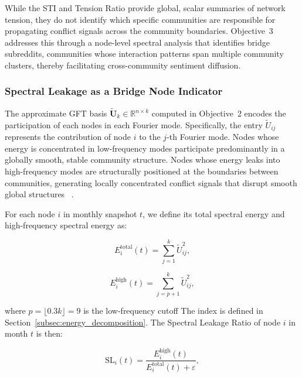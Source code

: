 \documentclass[a4paper,fleqn]{cas-dc}
\begin{document}
While the STI and Tension Ratio provide global, scalar summaries of
network tension, they do not identify which specific communities are
responsible for propagating conflict signals across the community
boundaries. Objective~3 addresses this through a node-level spectral
analysis that identifies bridge subreddits, communities
whose interaction patterns span multiple community clusters,
thereby facilitating cross-community sentiment diffusion.

\subsubsection{Spectral Leakage as a Bridge Node Indicator}
\label{subsec:spectral_leakage}

The approximate GFT basis $\tilde{\mathbf{U}}_k \in \mathbb{R}^{n
\times k}$ computed in Objective~2 encodes the participation of each
nodes in each Fourier mode. Specifically, the entry $\tilde{U}_{ij}$
represents the contribution of node $i$ to the $j$-th Fourier mode.
Nodes whose energy is concentrated in low-frequency modes participate
predominantly in a globally smooth, stable community structure. Nodes
whose energy leaks into high-frequency modes are structurally
positioned at the boundaries between communities, generating locally
concentrated conflict signals that disrupt smooth global
structures ~\cite{17_Shuman2013, 18_Ortega2018}.

For each node $i$ in monthly snapshot $t$, we define its total
spectral energy and high-frequency spectral energy as:

\begin{equation}
\label{eq:node_total_energy}
E_i^{\text{total}}(t) = \sum_{j=1}^{k} \tilde{U}_{ij}^2,
\end{equation}

\begin{equation}
\label{eq:node_high_energy}
E_i^{\text{high}}(t) = \sum_{j=p+1}^{k} \tilde{U}_{ij}^2,
\end{equation}

where $p = \lfloor 0.3k \rfloor = 9$ is the low-frequency cutoff
The index is defined in Section~\ref{subsec:energy_decomposition}. The
Spectral Leakage Ratio of node $i$ in month $t$ is then:

\begin{equation}
\label{eq:leakage_ratio}
\text{SL}_i(t) = \frac{E_i^{\text{high}}(t)}{E_i^{\text{total}}(t)
+ \varepsilon},
\end{equation}
\end{document}
